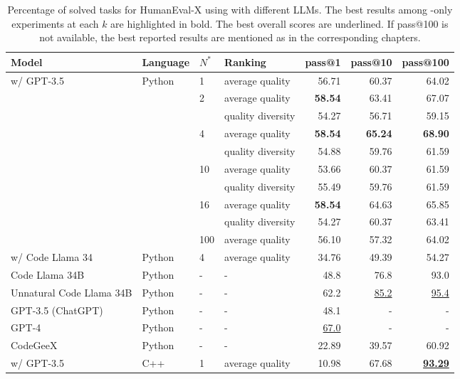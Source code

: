 \begin{table}
    \centering
    \caption{Percentage of solved tasks for HumanEval-X using \method{} with different LLMs. The best results among \method{}-only experiments at each $k$ are highlighted in bold. The best overall scores are underlined. If pass@100 is not available, the best reported results are mentioned as in the corresponding chapters. }\small
    \label{tab:generalisability-he}\vspace*{-4mm}
\begin{tabular}{llllrrr}
\toprule
Model & Language & $N^*$ & Ranking &  pass@1 &  pass@10 &  pass@100 \\
\midrule
\method{} w/ GPT-3.5 & Python & 1   & average quality &   56.71 &    60.37 &     64.02 \\
&        & 2   & average quality &   \textbf{58.54 }&    63.41 &     67.07 \\
&        &     & quality diversity  &   54.27 &    56.71 &     59.15 \\
&        & 4   & average quality &   \textbf{58.54} &    \textbf{65.24} &     \textbf{68.90} \\
&        &     & quality diversity  &   54.88 &    59.76 &     61.59 \\
&        & 10  & average quality &   53.66 &    60.37 &     61.59 \\
&        &     & quality diversity  &   55.49 &    59.76 &     61.59 \\
&        & 16  & average quality &   \textbf{58.54} &    64.63 &     65.85 \\
&        &     & quality diversity  &   54.27 &    60.37 &     63.41 \\
&        & 100 & average quality &   56.10 &    57.32 &     64.02 \\
\midrule
\method{} w/ Code Llama 34 & Python & 4 &  average quality &   34.76 &    49.39 &     54.27 \\
\midrule
Code Llama 34B & Python & - &  - &  48.8  &  76.8   &    93.0 \\
Unnatural Code Llama 34B & Python & - &  - &  62.2  &  \underline{85.2}   &    \underline{95.4} \\
GPT-3.5 (ChatGPT) & Python & - &  - &  48.1  &  -   &    - \\
GPT-4 & Python & -&  - & \underline{67.0}   &  -   &    - \\
CodeGeeX & Python & - &  - &  22.89  &  39.57   &    60.92 \\
\midrule
 \method{} w/ GPT-3.5 & C++ & 1   & average quality &   10.98 &    67.68 &     \underline{\textbf{93.29}} \\

\end{tabular}
\end{table}
